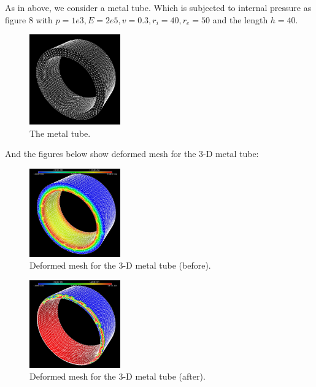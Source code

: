 \documentclass[notitlepage,a4paper,fleqn,9pt]{icmfarticle}
\begin{document}
\begin{multicols}{2}
As in above, we consider a metal tube. Which is subjected to internal pressure as figure 8 with $p=1e3,E=2e5, v=0.3, r_i=40, r_e=50$ and the length $h=40$.
\begin{figure}[H]
  \begin{center}
    \includegraphics[width=0.35\textwidth]{4-5.pdf}
  \end{center}
  \caption{The metal tube.}
  \label{fig-dg-neighbor}
\end{figure}

And the figures below show deformed mesh for the 3-D metal tube:

\begin{figure}[H]
  \begin{center}
    \includegraphics[width=0.35\textwidth]{4-5-1.pdf}
  \end{center}
  \caption{Deformed mesh for the 3-D metal tube (before).}
  \label{fig-dg-neighbor}
\end{figure}

\begin{figure}[H]
  \begin{center}
    \includegraphics[width=0.35\textwidth]{4-5-2.pdf}
  \end{center}
  \caption{Deformed mesh for the 3-D metal tube (after).}
  \label{fig-dg-neighbor}
\end{figure}


\end{multicols}
\end{document}
